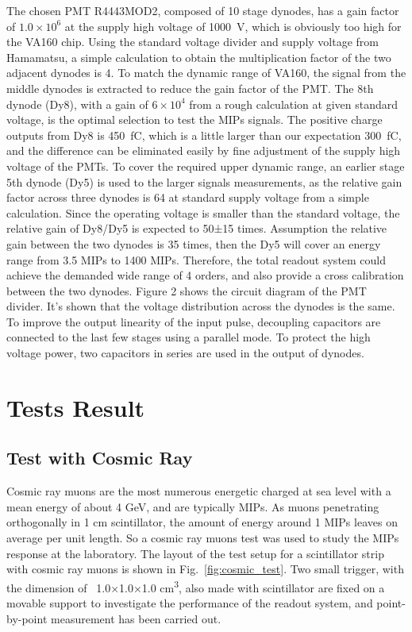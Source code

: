 \documentclass[5p, times]{elsarticle}
\begin{document}
The chosen PMT R4443MOD2, composed of 10 stage dynodes, has a gain factor of $1.0\times 10^6$ at the supply high voltage of \SI{1000}{\volt}, which is obviously too high for the VA160 chip. 
Using the standard voltage divider and supply voltage from Hamamatsu, a simple calculation to obtain the multiplication factor of the two adjacent dynodes is 4. 
To match the dynamic range of VA160, the signal from the middle dynodes is extracted to reduce the gain factor of the PMT. 
The 8th dynode (Dy8), with a gain of $6\times 10^4$ from a rough calculation at given standard voltage, is the optimal selection to test the MIPs signals. 
The positive charge outputs from Dy8 is \SI{450}{\femto\coulomb}, which is a little larger than our expectation \SI{300}{\femto\coulomb}, and the difference can be eliminated easily by fine adjustment of the supply high voltage of the PMTs. 
To cover the required upper dynamic range, an earlier stage 5th dynode (Dy5) is used to the larger signals measurements, as the relative gain factor across three dynodes is 64 at standard supply voltage from a simple calculation. 
Since the operating voltage is smaller than the standard voltage, the relative gain of Dy8/Dy5 is expected to 50±15 times. 
Assumption the relative gain between the two dynodes is 35 times, then the Dy5 will cover an energy range from 3.5 MIPs to 1400 MIPs. 
Therefore, the total readout system could achieve the demanded wide range of 4 orders, and also provide a cross calibration between the two dynodes. 
Figure 2 shows the circuit diagram of the PMT divider. 
It’s shown that the voltage distribution across the dynodes is the same. 
To improve the output linearity of the input pulse, decoupling capacitors are connected to the last few stages using a parallel mode. 
To protect the high voltage power, two capacitors in series are used in the output of dynodes.

\section{Tests Result}
\label{sec:result}

\subsection{Test with Cosmic Ray}
\label{sec:cosmicray}

Cosmic ray muons are the most numerous energetic charged at sea level with a mean energy of about 4 GeV, and are typically MIPs. 
As muons penetrating orthogonally in 1 cm scintillator, the amount of energy around 1 MIPs leaves on average per unit length. 
So a cosmic ray muons test was used to study the MIPs response at the laboratory. 
The layout of the test setup for a scintillator strip with cosmic ray muons is shown in Fig.~\ref{fig:cosmic_test}. 
Two small trigger, with the dimension of \ 1.0×1.0×1.0 cm\textsuperscript{3}, also made with scintillator are fixed on a movable support to investigate the performance of the readout system, and point-by-point measurement has been carried out. 
\end{document}
